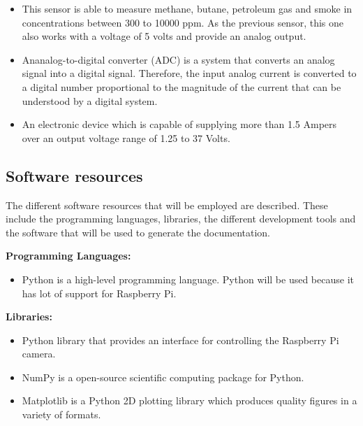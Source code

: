 \documentclass{pre-tfg}
\begin{document}
\begin{itemize}[noitemsep,nolistsep]
	\item {} This sensor is able to measure methane, butane, petroleum gas and smoke in concentrations between 300 to 10000 ppm. As the previous sensor, this one also works with a voltage of 5 volts and provide an analog output.
	
	\item {} Ananalog-to-digital converter (ADC) is a system that converts an analog signal into a digital signal. Therefore, the input analog current is converted to a digital number proportional to the magnitude of the current that can be understood by a digital system.	
	
	\item {} An electronic device which is capable of supplying more than 1.5 Ampers over an output voltage range of 1.25 to 37 Volts.
	
\end{itemize} 



\subsection{Software resources}
The different software resources that will be employed are described. These include the programming languages, libraries, the different development tools and the software that will be used to generate the documentation. \vspace{-2mm}

\textbf{Programming Languages:} \vspace{-4mm}
\begin{itemize}[noitemsep,nolistsep]
	\item {} Python is a high-level programming language.  Python will be used because it has lot of support for Raspberry Pi.
	
\end{itemize} \vspace{-2mm}

\textbf{Libraries:} \vspace{-4mm}
\begin{itemize}[noitemsep,nolistsep]
	\item {} Python library that provides an interface for controlling the Raspberry Pi camera.
	
	\item {} NumPy is a open-source scientific computing package for Python.
	
	\item {} Matplotlib is a Python 2D plotting library which produces quality figures in a variety of formats.
	
\end{itemize} \vspace{-2mm}
\end{document}

